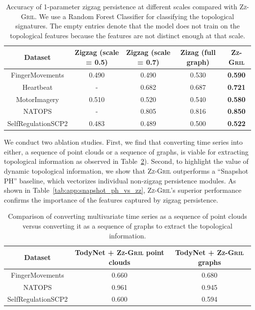 \documentclass{article}
\newcommand{\zzgril}{\textsc{Zz-Gril}}
\theoremstyle{plain}
\theoremstyle{definition}
\theoremstyle{remark}
\begin{document}
\begin{table}
    \centering
    \begin{tabular}{ccccc}
    \toprule
         \textbf{Dataset}&  Zigzag (scale = 0.5)&  Zigzag (scale = 0.7)& Zizag (full graph) &\zzgril\\
         \midrule
         FingerMovements&  0.490&  0.490&  0.530&\textbf{0.590}\\
         Heartbeat&  - &  0.682&  0.687&\textbf{0.721}\\
         MotorImagery&  0.510&  0.520&  0.540&\textbf{0.580}\\
         NATOPS&  -&  0.805&  0.816&\textbf{0.850}\\
 SelfRegulationSCP2& 0.483& 0.489& 0.500&\textbf{0.522}\\
 \bottomrule
    \end{tabular}
    \caption{Accuracy of 1-parameter zigzag persistence at different scales compared with \zzgril{}. We use a Random Forest Classifier for classifying the topological signatures. The empty entries denote that the model does not train on the topological features because the features are not distinct enough at that scale.}
    \label{tab:qzz_vs_zz}
\end{table}

We conduct two ablation studies. First, we find that converting time series into either, a sequence of point clouds or a sequence of graphs, is viable for extracting topological information as observed in Table~\ref{tab:app_exp_res}). Second, to highlight the value of dynamic topological information, we show that \zzgril{} outperforms a ``Snapshot PH'' baseline, which vectorizes individual non-zigzag persistence modules. As shown in Table~\ref{tab:app:snapshot_ph_vs_zz}, \zzgril{}'s superior performance confirms the importance of the features captured by zigzag persistence.

\begin{table}[htbp]
    \centering
    \begin{tabular}{ccc}
    \toprule
        \textbf{Dataset} & \textbf{TodyNet + \zzgril{} point clouds} & \textbf{TodyNet + \zzgril{} graphs}\\
        \midrule
         FingerMovements& 0.660 & 0.680\\
         NATOPS &0.961 & 0.945 \\
         SelfRegulationSCP2 &0.600 & 0.594\\
         \bottomrule
    \end{tabular}
    \caption{Comparison of converting multivariate time series as a sequence of point clouds versus converting it as a sequence of graphs to extract the topological information.}
    \label{tab:app_exp_res}
\end{table}
\end{document}
